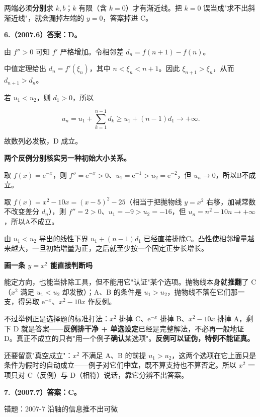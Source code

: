\documentclass[UTF8,11pt,fontset=windows]{ctexart}
\begin{document}
两端必须\textbf{分别}求 $k,b$；$k$ 有限（含 $k=0$）才有渐近线。把 $k=0$ 误当成"求不出斜渐近线"，就会漏掉左端的 $y=0$，答案掉进 C。

\clearpage

\textbf{6.（2007.6）答案：D。}

由 $f''>0$ 可知 $f'$ 严格增加。令相邻差 $d_n=f(n+1)-f(n)$。

中值定理给出 $d_n=f'(\xi_n)$，其中 $n<\xi_n<n+1$。因此 $\xi_{n+1}>\xi_n$，从而 $d_{n+1}>d_n$。

若 $u_1<u_2$，则 $d_1>0$，所以

$$
u_n=u_1+\sum_{k=1}^{n-1}d_k
\ge u_1+(n-1)d_1\longrightarrow+\infty.
$$

故数列必发散，D 成立。

\textbf{两个反例分别核实另一种初始大小关系。}

取 $f(x)=\mathrm e^{-x}$，则 $f''=\mathrm e^{-x}>0$、$u_1=\mathrm e^{-1}>u_2=\mathrm e^{-2}$，但 $u_n\to0$，所以B不成立。

取 $f(x)=x^2-10x=(x-5)^2-25$（相当于把抛物线 $y=x^2$ 右移，加减常数不改变差分 $d_n$），则 $f''=2>0$、$u_1=-9>u_2=-16$，但 $u_n=n^2-10n\to+\infty$，所以A不成立。

由 $u_1<u_2$ 导出的线性下界 $u_1+(n-1)d_1$ 已经直接排除C。凸性使相邻增量越来越大，一旦初始增量为正，之后就至少按一个固定正步长增长。

{\bfseries 画一条 $y=x^2$ 能直接判断吗\par}
能定方向，也能当排除工具，但不能用它"认证"某个选项。抛物线本身就\textbf{推翻}了 C（$x^2$ 满足 $u_1<u_2$ 却发散）；A、B 的条件是 $u_1>u_2$，抛物线不落在它们那一支，得另取 $\mathrm e^{-x}$、$x^2-10x$ 作反例。

不过举例正是选择题的标准打法：$x^2$ 排掉 C、$\mathrm e^{-x}$ 排掉 B、$x^2-10x$ 排掉 A，剩下 D 就是答案——\textbf{反例排干净 + 单选设定}已经是完整解法，不必再一般地证 D。真正不成立的只有"用一个例子\textbf{确认}某选项"。\textbf{反例可以证伪，特例不能证真。}

还要留意"真空成立"：$x^2$ 不满足 A、B 的前提 $u_1>u_2$，这两个选项在它上面只是条件为假时的自动成立——例子对它们\textbf{中立}，既不算支持也不算否定。所以 $x^2$ 一项只对 C（反例）与 D（相符）说话，靠它分辨不出答案。

\clearpage

\textbf{7.（2007.7）答案：C。}

\begingroup\color{gray}错题：2007-7 沿轴的信息推不出可微\par\endgroup
\end{document}
